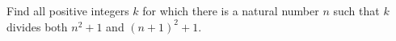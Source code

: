 Find all positive integers $k$ for which there is a natural number $n$ such that $k$ divides both $n^2+1$ and $(n+1)^2+1$.
